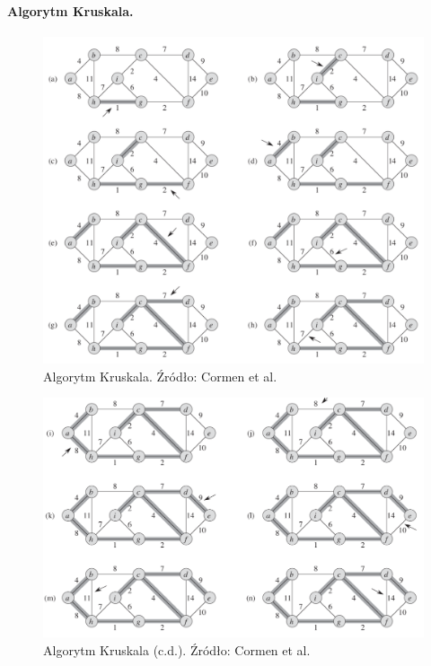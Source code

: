 \documentclass[10pt, oneside]{article}
\theoremstyle{remark}
\begin{document}
\paragraph{Algorytm Kruskala.}
\begin{figure}[htpb]
	\centering
	\includegraphics[width=.9\textwidth]{figures/kruskal1}
	\caption{Algorytm Kruskala. Źródło: Cormen et al.}
\end{figure}
\begin{figure}[htpb]
	\centering
	\includegraphics[width=.9\textwidth]{figures/kruskal2}
	\caption{Algorytm Kruskala (c.d.). Źródło: Cormen et al.}
\end{figure}
\end{document}
